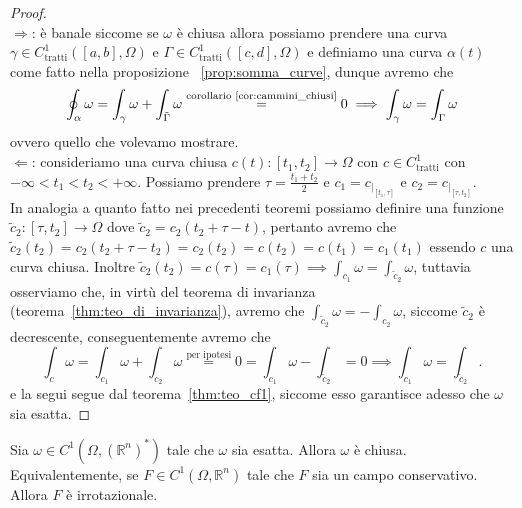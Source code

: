 \begin{proof} \hspace{1cm} \\
	$\boxed{\Rightarrow}$: è banale siccome se $\omega$ è chiusa allora possiamo prendere una curva $\gamma \in C^1_\text{tratti}([a, b], \Omega)$ e $\Gamma \in C^1_\text{tratti}([c, d], \Omega)$ e definiamo una curva $\alpha(t)$ come fatto nella proposizione
	~\ref{prop:somma_curve}, dunque avremo che
	$$
	\oint_\alpha \omega = \int_\gamma \omega + \int_{\tilde{\Gamma}} \omega \stackrel{\text{corollario~\ref{cor:cammini_chiusi}}}{=} 0 \implies \int_\gamma \omega = \int_\Gamma \omega
	$$
	ovvero quello che volevamo mostrare. \\
	$\boxed{\Leftarrow}$: consideriamo una curva chiusa $c(t): [t_1, t_2] \to \Omega$ con $c \in C^1_\text{tratti}$ con $-\infty < t_1 < t_2 < +\infty$. Possiamo prendere $\tau = \frac{t_1 + t_2}{2}$ e $c_1 = c_{|_{[t_1, \tau]}}$ e $c_2 = c_{|_{[\tau, t_2]}}$. \\
	In analogia a quanto fatto nei precedenti teoremi possiamo definire una funzione $\tilde{c}_2: [\tau, t_2] \to \Omega$ dove $\tilde{c}_2 = c_2(t_2 + \tau - t)$, pertanto avremo che $\tilde{c}_2(t_2) = c_2(t_2 + \tau - t_2) = c_2(t_2) = c(t_2) = c(t_1) = c_1(t_1)$ essendo $c$ una curva chiusa.
	Inoltre $\tilde{c}_2(t_2) = c(\tau) = c_1(\tau) \implies \int_{c_1} \omega = \int_{\tilde{c}_2} \omega$, tuttavia osserviamo che, in virtù del teorema di invarianza (teorema~\ref{thm:teo_di_invarianza}), avremo che $\int_{\tilde{c}_2} \omega = - \int_{c_2} \omega$, siccome $\tilde{c}_2$ è decrescente, conseguentemente avremo che
	$$
	\int_c \omega = \int_{c_1} \omega + \int_{c_2} \omega \stackrel{\text{per ipotesi}}{=} 0 = \int_{c_1} \omega - \int_{\tilde{c}_2} = 0 \implies \int_{c_1} \omega = \int_{\tilde{c}_2}.
	$$
	e la segui segue dal teorema~\ref{thm:teo_cf1}, siccome esso garantisce adesso che $\omega$ sia esatta.
\end{proof}
\begin{prop}
	Sia $\omega \in C^1(\Omega, (\mathbb{R}^n)^*)$ tale che $\omega$ sia esatta. Allora $\omega$ è chiusa. \\
	Equivalentemente, se $F \in C^1(\Omega, \mathbb{R}^n)$ tale che $F$ sia un campo conservativo. Allora $F$ è irrotazionale.
\end{prop}
